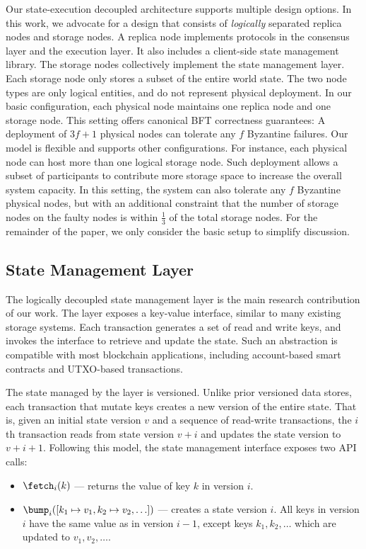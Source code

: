 Our state-execution decoupled architecture supports multiple design options.
In this work, we advocate for a design that consists of \emph{logically} separated replica nodes and storage nodes.
A replica node implements protocols in the consensus layer and the execution layer.
It also includes a client-side state management library.
The storage nodes collectively implement the state management layer.
Each storage node only stores a subset of the entire world state.
The two node types are only logical entities, and do not represent physical deployment.
In our basic configuration, each physical node maintains one replica node and one storage node.
This setting offers canonical BFT correctness guarantees: A deployment of $3f+1$ physical nodes can tolerate any $f$ Byzantine failures.
Our model is flexible and supports other configurations.
For instance, each physical node can host more than one logical storage node.
Such deployment allows a subset of participants to contribute more storage space to increase the overall system capacity.
In this setting, the system can also tolerate any $f$ Byzantine physical nodes, but with an additional constraint that the number of storage nodes on the faulty nodes is within $\frac{1}{3}$ of the total storage nodes.
For the remainder of the paper, we only consider the basic setup to simplify discussion.

\subsection{State Management Layer}
\label{sec:arch:layer}

The logically decoupled state management layer is the main research contribution of our work.
The layer exposes a key-value interface, similar to many existing storage systems.
Each transaction generates a set of read and write keys, and invokes the interface to retrieve and update the state.
Such an abstraction is compatible with most blockchain applications, including account-based smart contracts and UTXO-based transactions.

The state managed by the layer is versioned.
Unlike prior versioned data stores, each transaction that mutate keys creates a new version of the entire state.
That is, given an initial state version $v$ and a sequence of read-write transactions, the $i$th transaction reads from state version $v+i$ and updates the state version to $v+i+1$.
Following this model, the state management interface exposes two API calls:

\begin{itemize}
    \item $\fetch_{i}(k)$ --- returns the value of key $k$ in version $i$.

    \item $\bump_{i}([k_1 \mapsto v_1, k_2 \mapsto v_2, \ldots])$ --- creates a state version $i$.
    All keys in version $i$ have the same value as in version $i-1$, except keys $k_1, k_2, \ldots$ which are updated to $v_1, v_2, \ldots$.
\end{itemize}

